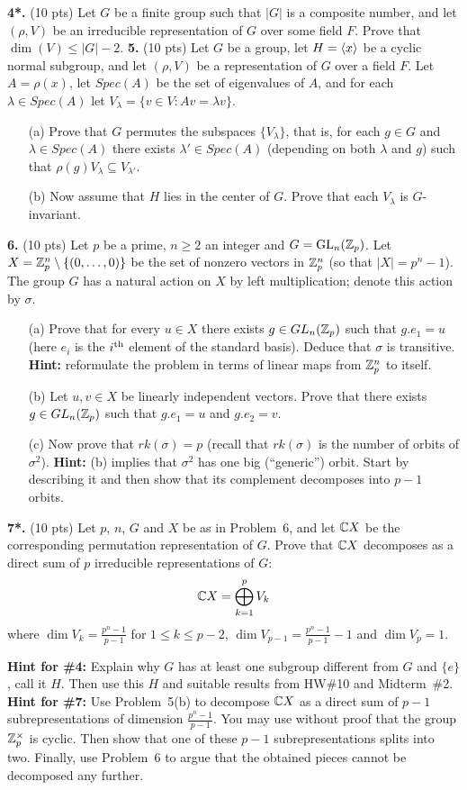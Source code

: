 \documentclass[12pt]{amsart}
\begin{document}
\skv
{\bf 4*.} (10 pts) Let $G$ be a finite group such that $|G|$ is a composite number, and let $(\rho,V)$ be an irreducible representation of $G$ over some field $F$. Prove that $\dim(V)\leq |G|-2$.
\skv
{\bf 5.} (10 pts) Let $G$ be a group, let $H={\langle} x{\rangle}$ be a cyclic normal subgroup, and let $(\rho,V)$ be a representation of $G$ over a field $F$. Let $A=\rho(x)$, let 
$Spec(A)$ be the set of eigenvalues of $A$,
and for each $\lambda\in Spec(A)$ let
$V_{\lambda}=\{v\in V: Av=\lambda v\}$.
\begin{itemize}
\item[(a)] Prove that $G$ permutes the subspaces 
$\{V_{\lambda}\}$, that is, for each $g\in G$ and $\lambda\in Spec(A)$
there exists $\lambda'\in Spec(A)$ (depending on both $\lambda$ and $g$)
such that $\rho(g)V_{\lambda}\subseteq V_{\lambda'}$.
\item[(b)] Now assume that $H$ lies in the center of $G$. Prove that
each $V_{\lambda}$ is $G$-invariant.
\end{itemize}
\skv
{\bf 6.} (10 pts)
Let $p$ be a prime, $n\geq 2$ an integer and $G={\rm GL}_n({\mathbb Z}_p)$. Let 
$X={\mathbb Z}_p^n\setminus \{(0,\ldots, 0)\}$ be the set of nonzero vectors in ${\mathbb Z}_p^n$ (so that $|X|=p^n-1$).
The group $G$ has a natural action on $X$ by left multiplication; denote this action by $\sigma$.
\begin{itemize}
\item[(a)] Prove that for every $u\in X$ there exists $g\in GL_n({\mathbb Z}_p)$ such that $g.e_1=u$ 
(here $e_i$ is the $i^{\rm th}$ element of the standard basis). Deduce that $\sigma$ is transitive. {\bf Hint:} reformulate the
problem in terms of linear maps from ${\mathbb Z}_p^n$ to itself.
\item[(b)] Let $u,v\in X$ be linearly independent vectors. Prove that there exists $g\in GL_n({\mathbb Z}_p)$
such that $g.e_1=u$ and $g.e_2=v$.
\item[(c)] Now prove that $rk(\sigma)=p$ (recall that $rk(\sigma)$ is the number of orbits of $\sigma^2$). 
{\bf Hint:} (b) implies that $\sigma^2$ has one big (``generic'') orbit. Start by describing it and then
show that its complement decomposes into $p-1$ orbits.
\end{itemize}

\skv
{\bf 7*.} (10 pts) Let $p$, $n$, $G$ and $X$ be as in Problem~6,
and let ${\mathbb C} X$ be the corresponding permutation representation of $G$. Prove that ${\mathbb C} X$ decomposes as a direct sum of $p$ irreducible
representations of $G$:
$${\mathbb C} X=\bigoplus_{k=1}^p V_k$$
where $\dim V_k=\frac{p^n-1}{p-1}$ for $1\leq k\leq p-2$, $\dim V_{p-1}=\frac{p^n-1}{p-1}-1$ and
$\dim V_p=1$.
\skv

\newpage
{\bf Hint for \#4:} Explain why $G$ has at least one subgroup different from $G$ and $\{e\}$, call it $H$. Then use this $H$ and suitable results from HW\#10 and Midterm~\#2.
\newpage
{\bf Hint for \#7:} Use Problem~5(b) to decompose ${\mathbb C} X$ as a direct sum of $p-1$ subrepresentations
of dimension $\frac{p^n-1}{p-1}$. You may use without proof that the group ${\mathbb Z}_p^{\times}$ is cyclic. Then show that one of these $p-1$ subrepresentations splits into two. Finally, use Problem~6 to argue that the obtained pieces cannot be decomposed any further. 
\end{document}
